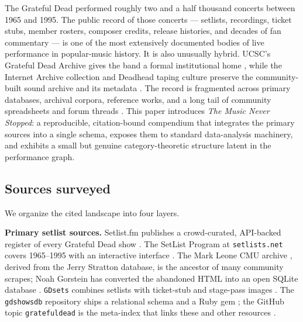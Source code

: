 \documentclass[
]{article}
\begin{document}
The Grateful Dead performed roughly two and a half thousand concerts
between 1965 and 1995. The public record of those concerts --- setlists,
recordings, ticket stubs, member rosters, composer credits, release
histories, and decades of fan commentary --- is one of the most
extensively documented bodies of live performance in popular-music
history. It is also unusually hybrid. UCSC's Grateful Dead Archive gives
the band a formal institutional home \citep{ucsc_grateful_dead_archive},
while the Internet Archive collection and Deadhead taping culture
preserve the community-built sound archive and its metadata
\citep{internet_archive_gd_collection_policy, dead_net_taping_dead, wallace_cocreation_sound_archive}.
The record is fragmented across primary databases, archival corpora,
reference works, and a long tail of community spreadsheets and forum
threads
\citep{reddit_data_sets, reddit_setlist_db, reddit_spreadsheet_archive}.
This paper introduces \emph{The Music Never Stopped}: a reproducible,
citation-bound compendium that integrates the primary sources into a
single schema, exposes them to standard data-analysis machinery, and
exhibits a small but genuine category-theoretic structure latent in the
performance graph.

\subsection{Sources surveyed}\label{sources-surveyed}

We organize the cited landscape into four layers.

\textbf{Primary setlist sources.} Setlist.fm publishes a crowd-curated,
API-backed register of every Grateful Dead show \citep{setlistfm_gd}.
The SetList Program at \texttt{setlists.net} covers 1965--1995 with an
interactive interface \citep{setlists_net_program}. The Mark Leone CMU
archive \citep{cmu_leone_setlists}, derived from the Jerry Stratton
database, is the ancestor of many community scrapes; Noah Gorstein has
converted the abandoned HTML into an open SQLite database
\citep{noah_truckin_through_time}. \texttt{GDsets} combines setlists
with ticket-stub and stage-pass images \citep{gdsets_com, gdsets_dead}.
The \texttt{gdshowsdb} repository ships a relational schema and a Ruby
gem \citep{gdshowsdb}; the GitHub topic \texttt{gratefuldead} is the
meta-index that links these and other resources
\citep{github_topic_gratefuldead}.
\end{document}
